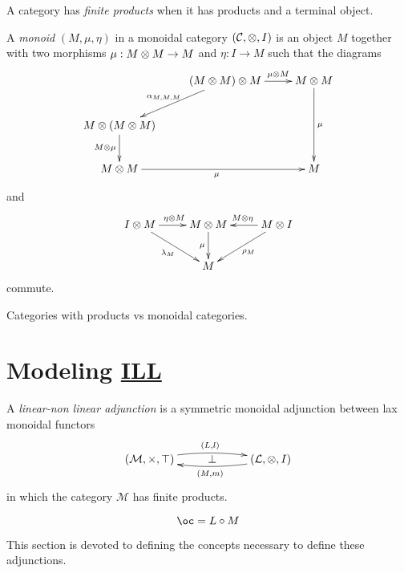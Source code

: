 A category has \emph{finite products} when it has products and a terminal object.

\begin{definition}[Monoid]
A \emph{monoid} $(M,\mu,\eta)$ in a monoidal category $(\mathcal{C},\otimes,I)$ is an object $M$ together with two morphisms $\mu:M\otimes M \to M$ and $\eta:I\to M$
such that the diagrams
\begin{equation*}
\xymatrix{
& (M\tens M)\tens M\ar[dl]_{\alpha_{M,M,M}}\ar[r]^-{\mu\tens M}& M\tens M\ar[dd]^{\mu}\\
M\tens(M\tens M)\ar[d]_{M\tens\mu}& & \\
M\tens M\ar[rr]_{\mu}& & M\\
}
\end{equation*}
and
\begin{equation*}
\xymatrix{
I\tens M\ar[r]^{\eta\tens M}\ar[dr]_{\lambda_M}& M\tens M\ar[d]_\mu& \ar[l]_{M\tens\eta}\ar[dl]^{\rho_M}M\tens I\\
& M& 
}
\end{equation*}
commute.
\end{definition}

\begin{property}
Categories with products vs monoidal categories.
\end{property}



\section{\texorpdfstring{Modeling \hyperref[intuitionistic-linear-logic]{ILL}}{Modeling ILL}}\label{modeling-ill}

\begin{definition}
A \emph{linear-non linear adjunction} is a symmetric monoidal adjunction between lax monoidal functors
\begin{equation*}
\xymatrix{
(\mathcal{M},\times,\top)\ar@/^/[rr]^{(L,l)}& \bot& \ar@/^/[ll]^{(M,m)}(\mathcal{L},\otimes,I)
}
\end{equation*}
in which the category $\mathcal{M}$ has finite products.
\end{definition}

\[\oc=L\circ M\]

This section is devoted to defining the concepts necessary to define
these adjunctions.

